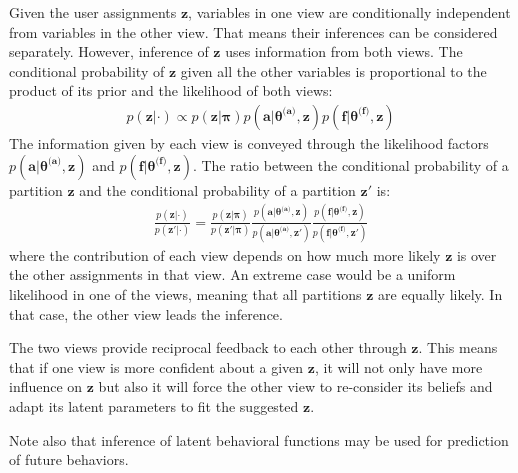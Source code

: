 \documentclass[smallextended]{svjour3}          %
\begin{document}
Given the user assignments $\mathbf{z}$, variables in one view are conditionally independent from variables in the other view. That means their inferences can be considered separately. However, inference of $\mathbf{z}$ uses information from both views. The conditional probability of $\mathbf{z}$ given all the other variables is proportional to the product of its prior and the likelihood of both views:
\begin{align}
p(\mathbf{z} | \cdot) 
\propto
p(\mathbf{z} | \boldsymbol{\pi}) 
p(\mathbf{a} | \boldsymbol{\theta^{\text{(a)}}}, \mathbf{z}) 
p(\mathbf{f} | \boldsymbol{\theta^{\text{(f)}}}, \mathbf{z})
\label{eq:z_posterior}
\end{align}
\sloppy
The information given by each view is conveyed through the likelihood factors $p(\mathbf{a} | \boldsymbol{\theta^{\text{(a)}}}, \mathbf{z})$ and $p(\mathbf{f} | \boldsymbol{\theta^{\text{(f)}}}, \mathbf{z})$. The ratio between the conditional probability of a partition $\mathbf{z}$ and the conditional probability of a partition $\mathbf{z'}$ is:
\begin{align}
\frac
{p(\mathbf{z}| \cdot)}
{p(\mathbf{z'}| \cdot)}
= 
\frac{
p(\mathbf{z} | \boldsymbol{\pi})
}{
p(\mathbf{z'} | \boldsymbol{\pi})
}
\frac{
p(\mathbf{a} | \boldsymbol{\theta^{\text{(a)}}}, \mathbf{z})
}{
{p(\mathbf{a} | \boldsymbol{\theta^{\text{(a)}}}, \mathbf{z'})}
}
\frac{
p(\mathbf{f} | \boldsymbol{\theta^{\text{(f)}}}, \mathbf{z})
}{
{p(\mathbf{f} | \boldsymbol{\theta^{\text{(f)}}}, \mathbf{z'})}
}
\label{eq:z_posterior_ratio}
\end{align}
\fussy
where the contribution of each view depends on how much more likely $\mathbf{z}$ is over the other assignments in that view. An extreme case would be a uniform likelihood in one of the views, meaning that all partitions $\mathbf{z}$ are equally likely. In that case, the other view leads the inference. 

The two views provide reciprocal feedback to each other through $\mathbf{z}$. This means that if one view is more confident about a given $\mathbf{z}$, it will not only have more influence on $\mathbf{z}$ but also it will force the other view to re-consider its beliefs and adapt its latent parameters to fit the suggested $\mathbf{z}$. 

Note also that inference of latent behavioral functions may be used for prediction of future behaviors.

\end{document}
